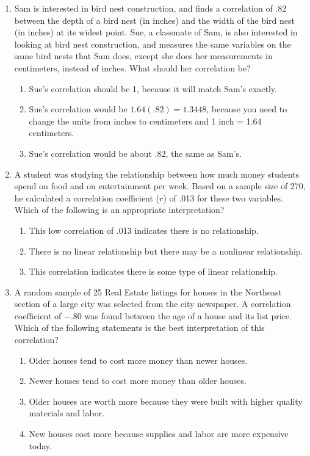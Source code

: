 \documentclass[11pt]{umnthesis}
\begin{document}
\begin{enumerate}
\def\labelenumi{\arabic{enumi}.}
\tightlist
\item
  Sam is interested in bird nest construction, and finds a correlation of .82 between the depth of a bird nest (in inches) and the width of the bird nest (in inches) at its widest point. Sue, a classmate of Sam, is also interested in looking at bird nest construction, and measures the same variables on the same bird nests that Sam does, except she does her measurements in centimeters, instead of inches. What should her correlation be?

  \begin{enumerate}
  \def\labelenumii{\alph{enumii}.}
  \tightlist
  \item
    Sue's correlation should be 1, because it will match Sam's exactly.
  \item
    Sue's correlation would be \(1.64(.82) = 1.3448\), because you need to change the units from inches to centimeters and 1 inch = 1.64 centimeters.
  \item
    Sue's correlation would be about .82, the same as Sam's.
  \end{enumerate}
\item
  A student was studying the relationship between how much money students spend on food and on entertainment per week. Based on a sample size of 270, he calculated a correlation coefficient (\(r\)) of .013 for these two variables. Which of the following is an appropriate interpretation?

  \begin{enumerate}
  \def\labelenumii{\alph{enumii}.}
  \tightlist
  \item
    This low correlation of .013 indicates there is no relationship.
  \item
    There is no linear relationship but there may be a nonlinear relationship.
  \item
    This correlation indicates there is some type of linear relationship.
  \end{enumerate}
\item
  A random sample of 25 Real Estate listings for houses in the Northeast section of a large city was selected from the city newspaper. A correlation coefficient of \(-.80\) was found between the age of a house and its list price. Which of the following statements is the best interpretation of this correlation?

  \begin{enumerate}
  \def\labelenumii{\alph{enumii}.}
  \tightlist
  \item
    Older houses tend to cost more money than newer houses.
  \item
    Newer houses tend to cost more money than older houses.
  \item
    Older houses are worth more because they were built with higher quality materials and labor.
  \item
    New houses cost more because supplies and labor are more expensive today.
  \end{enumerate}
\end{enumerate}
\end{document}
